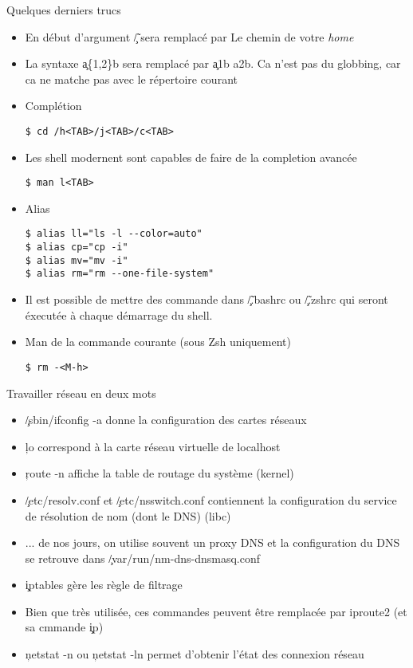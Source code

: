 \begin{frame}[fragile=singleslide]{Quelques derniers trucs}
  \begin{itemize}
  \item  En début d'argument \c{\~/} sera remplacé par Le chemin de votre \emph{home}
  \item La syntaxe \c{a\{1,2\}b} sera remplacé par \c{a1b a2b}. Ca
    n'est pas du globbing, car ca ne matche pas avec le répertoire
    courant
  \item Complétion
    \begin{lstlisting}
$ cd /h<TAB>/j<TAB>/c<TAB>
    \end{lstlisting}
  \item Les shell modernent sont capables de faire de la completion avancée
    \begin{lstlisting}
$ man l<TAB>
    \end{lstlisting}
  \item Alias
    \begin{lstlisting}
$ alias ll="ls -l --color=auto"
$ alias cp="cp -i"
$ alias mv="mv -i"
$ alias rm="rm --one-file-system"
    \end{lstlisting} %
  \item Il est possible de mettre des commande dans \c{\~/.bashrc} ou
    \c{\~/.zshrc} qui seront éxecutée à chaque démarrage du shell.
  \item Man de la commande courante (sous Zsh uniquement)
    \begin{lstlisting}
$ rm -<M-h>
    \end{lstlisting} %
  \end{itemize}
\end{frame}

\begin{frame}[fragile=singleslide]{Travailler réseau en deux mots}
  \begin{itemize}
  \item \c{/sbin/ifconfig -a} donne la configuration des cartes réseaux
  \item \c{lo} correspond à la carte réseau virtuelle de localhost
  \item \c{route -n} affiche la table de routage du système (kernel)
  \item \c{/etc/resolv.conf} et \c{/etc/nsswitch.conf} contiennent la
    configuration du service de résolution de nom (dont le DNS) (libc)
  \item ... de nos jours, on utilise souvent un proxy DNS et la
    configuration du DNS se retrouve dans
    \c{/var/run/nm-dns-dnsmasq.conf}
  \item \c{iptables} gère les règle de filtrage
  \item Bien que très utilisée, ces commandes peuvent être remplacée
    par iproute2 (et sa cmmande \c{ip})
  \item \c{netstat -n} ou \c{netstat -ln} permet d'obtenir l'état des
    connexion réseau
  \end{itemize}
\end{frame}

